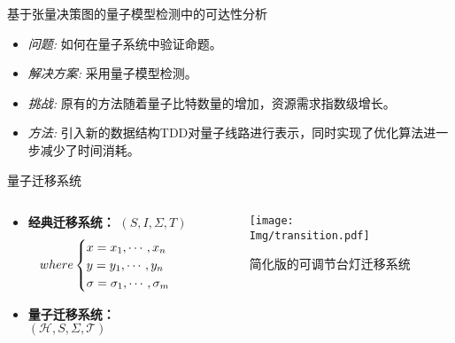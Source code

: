 \documentclass[aspectratio=1610]{ctexbeamer}
\begin{document}
\begin{frame}{基于张量决策图的量子模型检测中的可达性分析}
    \begin{itemize}
            \setlength\itemsep{1em} %
            \item \textit{问题:} 如何在量子系统中验证命题。
            \item \textit{解决方案:} 采用量子模型检测。
            \item \textit{挑战:} 原有的方法随着量子比特数量的增加，资源需求指数级增长。
            \item \textit{方法:} 引入新的数据结构TDD对量子线路进行表示，同时实现了优化算法进一步减少了时间消耗。
    \end{itemize}
\end{frame}
\begin{frame}{量子迁移系统}
    \begin{columns} %

        \begin{column}{.5\textwidth}
            \begin{itemize}
                \item<1->  \textbf{经典迁移系统：} $(S, I, \Sigma, T)$
                \begin{equation}
                  where
                  \begin{cases}
                    x = x_1, \cdots, x_n\\
                    y = y_1, \cdots, y_n\\
                    \sigma = \sigma_1, \cdots, \sigma_m
                  \end{cases}
                  \notag
                \end{equation}
                \item<2-> \textbf{量子迁移系统：} $(\mathcal{H},S,\Sigma,\mathcal{T})$
            \end{itemize}
        \end{column}
        \begin{column}{.5\textwidth}
          \begin{figure}
            \centering
            \texttt{[image: Img/transition.pdf]}
        \caption{简化版的可调节台灯迁移系统}
        \end{figure}
        \end{column}
    
      \end{columns}
\end{frame}
\end{document}
